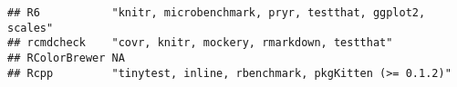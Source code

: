 \documentclass[]{book}
\begin{document}
\begin{verbatim}
## R6           "knitr, microbenchmark, pryr, testthat, ggplot2, scales"                                                                                                                                                                                                                                                                                                                                                                                                                                                                                                                                                                                                                                                  
## rcmdcheck    "covr, knitr, mockery, rmarkdown, testthat"                                                                                                                                                                                                                                                                                                                                                                                                                                                                                                                                                                                                                                                               
## RColorBrewer NA                                                                                                                                                                                                                                                                                                                                                                                                                                                                                                                                                                                                                                                                                                        
## Rcpp         "tinytest, inline, rbenchmark, pkgKitten (>= 0.1.2)"                                                                                                                                                                                                                                                                                                                                                                                                                                                                                                                                                                                                                                                      

\end{verbatim}
\end{document}
